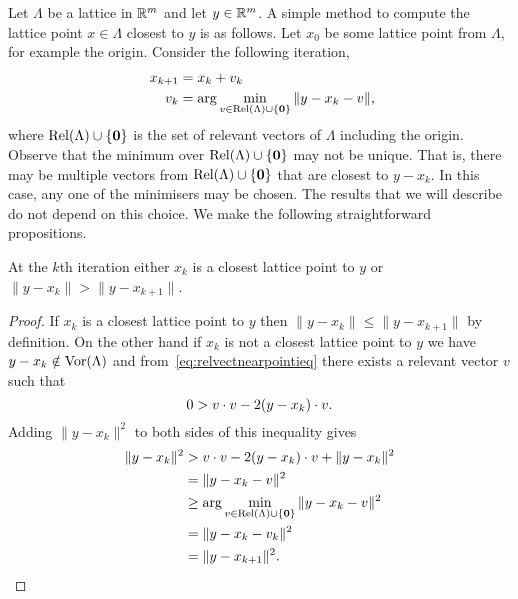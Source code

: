 \documentclass[final,leqno]{siamltex}
\begin{document}
Let $\Lambda$ be a lattice in ${\mathbb R}^m$ and let $y \in {\mathbb R}^m$. A simple method to compute the lattice point $x \in \Lambda$ closest to $y$ is as follows.  Let $x_0$ be some lattice point from $\Lambda$, for example the origin.  Consider the following iteration,
\begin{align}\
x_{k+1} &= x_k + v_k \nonumber \\
v_k &= \arg\min_{ v \in \relevant(\Lambda) \cup \{\zerobf\} } \|y - x_k - v \|, \label{eq:relvectsminimslicer}
\end{align} 
where $\operatorname{Rel}(\Lambda) \cup \{\boldsymbol{0}\}$ is the set of relevant vectors of $\Lambda$ including the origin.  Observe that the minimum over $\operatorname{Rel}(\Lambda) \cup \{\boldsymbol{0}\}$ may not be unique.  That is, there may be multiple vectors from $\operatorname{Rel}(\Lambda) \cup \{\boldsymbol{0}\}$ that are closest to $y - x_k$.  In this case, any one of the minimisers may be chosen.  The results that we will describe do not depend on this choice. We make the following straightforward propositions.

\begin{proposition}\label{obs:1}
At the $k$th iteration either $x_k$ is a closest lattice point to $y$ or $\|y - x_k\| > \| y - x_{k+1} \|$.
\end{proposition}
\begin{proof}
If $x_k$ is a closest lattice point to $y$ then $\|y - x_k\| \leq \| y - x_{k+1} \|$ by definition.  On the other hand if $x_k$ is not a closest lattice point to $y$ we have $y - x_k \notin \operatorname{Vor}(\Lambda)$ and from~\eqref{eq:relvectnearpointieq} there exists a relevant vector $v$ such that
\[
0 > v \cdot v - 2(y - x_k) \cdot v.
\]
Adding $\|y - x_k\|^2$ to both sides of this inequality gives
\begin{align*}
\|y - x_k\|^2 &> v \cdot v - 2(y - x_k) \cdot v + \|y - x_k\|^2 \\
&= \|y - x_k - v\|^2 \\
&\geq \arg\min_{ v \in \operatorname{Rel}(\Lambda) \cup \{\boldsymbol{0}\}}\|y - x_k - v \|^2 \\
&= \|y - x_k - v_k \|^2 \\
&= \|y - x_{k+1}\|^2. 
\end{align*}
\end{proof} 
\end{document}
